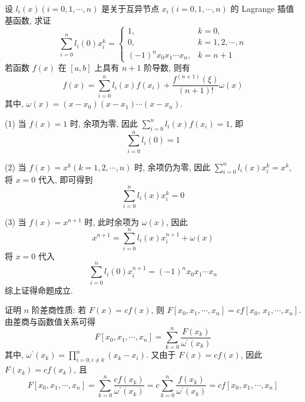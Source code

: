   \begin{tcolorbox}[enhanced,colback=10,colframe=9,breakable,coltitle=green!25!black,title=2024]
 设 $ l_{i}(x)(i=0,1, \cdots, n) $ 是关于互异节点 $ x_{i}(i=0,1, \cdots, n) $ 的 Lagrange 插值基函数, 求证
$$
\sum_{i=0}^{n} l_{i}(0) x_{i}^{k}=\left\{\begin{array}{ll}
1, & k=0, \\
0, & k=1,2, \cdots, n \\
(-1)^{n} x_{0} x_{1} \cdots x_{n}, & k=n+1
\end{array}\right.
$$
\tcblower
 若函数 $ f(x) $ 在 $ [a, b] $ 上具有 $ n+1 $ 阶导数, 则有
$$
f(x)=\sum_{i=0}^{n} l_{i}(x) f\left(x_{i}\right)+\frac{f^{(n+1)}(\xi)}{(n+1)!} \omega(x)
$$
其中, $ \omega(x)=\left(x-x_{0}\right)\left(x-x_{1}\right) \cdots\left(x-x_{n}\right) $.

(1) 当 $ f(x)=1 $ 时, 余项为零, 因此 $ \sum\limits_{i=0}^{n} l_{i}(x) f\left(x_{i}\right)=1 $, 即
$$
\sum_{i=0}^{n} l_{i}(0)=1
$$

(2) 当 $ f(x)=x^{k}(k=1,2, \cdots, n) $ 时, 余项仍为零, 因此 $ \sum\limits_{i=0}^{n} l_{i}(x) x_{i}^{k}=x^{k} $, 将 $ x=0 $ 代入, 即可得到
$$
\sum_{i=0}^{n} l_{i}(x) x_{i}^{k}=0
$$

(3) 当 $ f(x)=x^{n+1} $ 时, 此时余项为 $ \omega(x) $, 因此
$$
x^{n+1}=\sum_{i=0}^{n} l_{i}(x) x_{i}^{n+1}+\omega(x)
$$
将 $ x=0 $ 代入
$$
\sum_{i=0}^{n} l_{i}(0) x_{i}^{n+1}=(-1)^{n} x_{0} x_{1} \cdots x_{n}
$$
综上证得命题成立.
\end{tcolorbox}

\begin{tcolorbox}[enhanced,colback=10,colframe=9,breakable,coltitle=green!25!black,title=2024]
证明 $ n $ 阶差商性质: 若 $ F(x)=c f(x) $, 则 $ F\left[x_{0}, x_{1}, \cdots, x_{n}\right]=c f\left[x_{0}\right. $, $ \left.x_{1}, \cdots, x_{n}\right] $.
\tcblower
 由差商与函数值关系可得
$$
F\left[x_{0}, x_{1}, \cdots, x_{n}\right]=\sum_{k=0}^{n} \frac{F\left(x_{k}\right)}{\omega^{\prime}\left(x_{k}\right)}
$$
其中, $ \omega^{\prime}\left(x_{k}\right)=\prod_{i=0, i \neq k}^{n}\left(x_{k}-x_{i}\right) $.
又由于 $ F(x)=c f(x) $, 因此 $ F\left(x_{k}\right)=c f\left(x_{k}\right) $, 且
$$
F\left[x_{0}, x_{1}, \cdots, x_{n}\right]=\sum_{k=0}^{n} \frac{c f\left(x_{k}\right)}{\omega^{\prime}\left(x_{k}\right)}=c \sum_{k=0}^{n} \frac{f\left(x_{k}\right)}{\omega^{\prime}\left(x_{k}\right)}=c f\left[x_{0}, x_{1}, \cdots, x_{n}\right]
$$
\end{tcolorbox}



